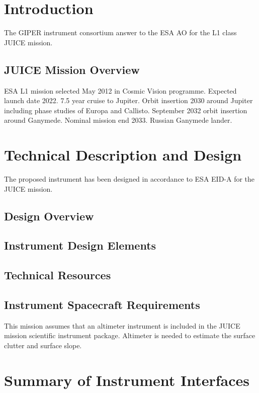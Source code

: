 \section{Introduction}
\label{sec:introduction}
%
The GIPER instrument consortium answer to the ESA \ac{AO}\cite{JUICE_AO} for the L1 class \ac{JUICE} mission.
%
%
\subsection{JUICE Mission Overview}
ESA L1 mission selected May 2012 in Cosmic Vision programme. Expected launch date 2022. 7.5 year cruise to Jupiter. Orbit insertion 2030 around Jupiter including phase studies of Europa and Callisto. September 2032 orbit insertion around Ganymede. Nominal mission end 2033. Russian Ganymede lander.
%
%



\section{Technical Description and Design}
%
The proposed instrument has been designed in accordance to ESA \ac{EID-A} for the \ac{JUICE} mission\cite{EIDA}.
%
\subsection{Design Overview}
\subsection{Instrument Design Elements}
\subsection{Technical Resources}
\subsection{Instrument Spacecraft Requirements}
This mission assumes that an altimeter instrument is included in the JUICE mission scientific instrument package. Altimeter is needed to estimate the surface clutter and surface slope.
%
\section{Summary of Instrument Interfaces}
%
